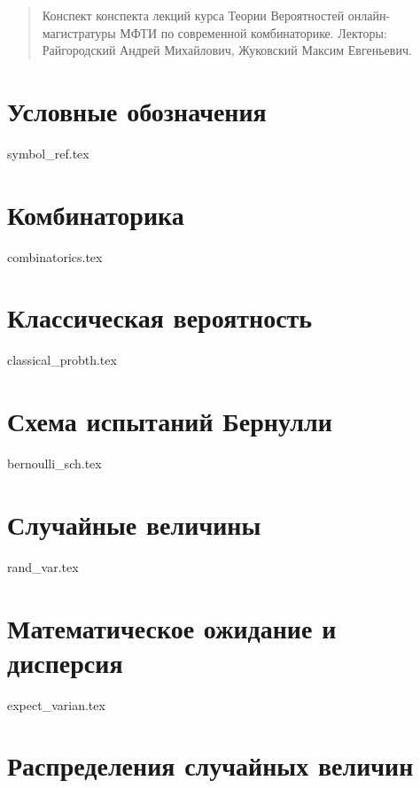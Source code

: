 \documentclass{article}
\theoremstyle{mydef}
\theoremstyle{myth}
\begin{document}
\begin{abstract}
    Конспект конспекта лекций курса Теории Вероятностей онлайн-магистратуры МФТИ по современной комбинаторике. \newline
    Лекторы: Райгородский Андрей Михайлович, Жуковский Максим Евгеньевич.
\end{abstract}

\tableofcontents
 
\newpage

\section{Условные обозначения}

{symbol_ref.tex}

\section{Комбинаторика}

{combinatorics.tex}

\section{Классическая вероятность}

{classical_probth.tex}

\section{Схема испытаний Бернулли}

{bernoulli_sch.tex}

\section{Случайные величины}\label{sec:rand_var}

{rand_var.tex}

\section{Математическое ожидание и дисперсия}

{expect_varian.tex}

\section{Распределения случайных величин}
\end{document}
